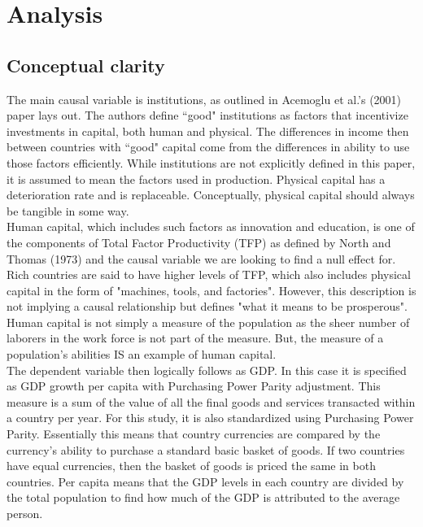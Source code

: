 \documentclass[12pt]{article}
\begin{document}
{\section{Analysis}

\subsection{Conceptual clarity}
		
The main causal variable is institutions, as outlined in Acemoglu et al.'s (2001) paper lays out. The authors define ``good" institutions as factors that incentivize investments in capital, both human and physical. The differences in income then between countries with ``good" capital come from the differences in ability to use those factors efficiently. While institutions are not explicitly defined in this paper, it is assumed to mean the factors used in production. Physical capital has a deterioration rate and is replaceable. Conceptually, physical capital should always be tangible in some way.\\

Human capital, which includes such factors as innovation and education, is one of the components of Total Factor Productivity (TFP) as defined by North and Thomas (1973) and the causal variable we are looking to find a null effect for. Rich countries are said to have higher levels of TFP, which also includes physical capital in the form of "machines, tools, and factories". However, this description is not implying a causal relationship but defines "what it means to be prosperous". Human capital is not simply a measure of the population as the sheer number of laborers in the work force is not part of the measure. But, the measure of a population's abilities IS an example of human capital.\\

The dependent variable then logically follows as GDP. In this case it is specified as GDP growth per capita with Purchasing Power Parity adjustment. This measure is a sum of the value of all the final goods and services transacted within a country per year. For this study, it is also standardized using Purchasing Power Parity. Essentially this means that country currencies are compared by the currency's ability to purchase a standard basic basket of goods. If two countries have equal currencies, then the basket of goods is priced the same in both countries. Per capita means that the GDP levels in each country are divided by the total population to find how much of the GDP is attributed to the average person.\\

}
\end{document}
